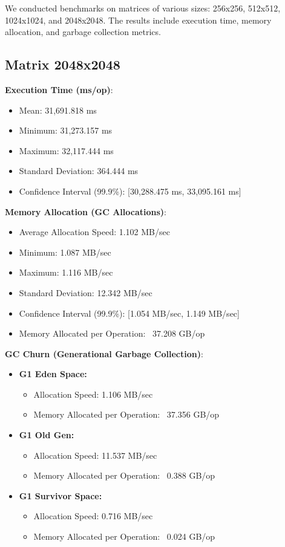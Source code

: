 \documentclass{article}
\begin{document}
We conducted benchmarks on matrices of various sizes: 256x256, 512x512, 1024x1024, and 2048x2048. The results include execution time, memory allocation, and garbage collection metrics.

\subsection{Matrix 2048x2048}
\textbf{Execution Time (ms/op)}:
\begin{itemize}
    \item Mean: 31,691.818 ms
    \item Minimum: 31,273.157 ms
    \item Maximum: 32,117.444 ms
    \item Standard Deviation: 364.444 ms
    \item Confidence Interval (99.9\%): [30,288.475 ms, 33,095.161 ms]
\end{itemize}

\textbf{Memory Allocation (GC Allocations)}:
\begin{itemize}
    \item Average Allocation Speed: 1.102 MB/sec
    \item Minimum: 1.087 MB/sec
    \item Maximum: 1.116 MB/sec
    \item Standard Deviation: 12.342 MB/sec
    \item Confidence Interval (99.9\%): [1.054 MB/sec, 1.149 MB/sec]
    \item Memory Allocated per Operation: ~37.208 GB/op
\end{itemize}

\textbf{GC Churn (Generational Garbage Collection)}:
\begin{itemize}
    \item \textbf{G1 Eden Space:}
    \begin{itemize}
        \item Allocation Speed: 1.106 MB/sec
        \item Memory Allocated per Operation: ~37.356 GB/op
    \end{itemize}
    \item \textbf{G1 Old Gen:}
    \begin{itemize}
        \item Allocation Speed: 11.537 MB/sec
        \item Memory Allocated per Operation: ~0.388 GB/op
    \end{itemize}
    \item \textbf{G1 Survivor Space:}
    \begin{itemize}
        \item Allocation Speed: 0.716 MB/sec
        \item Memory Allocated per Operation: ~0.024 GB/op
    \end{itemize}
\end{itemize}
\end{document}
